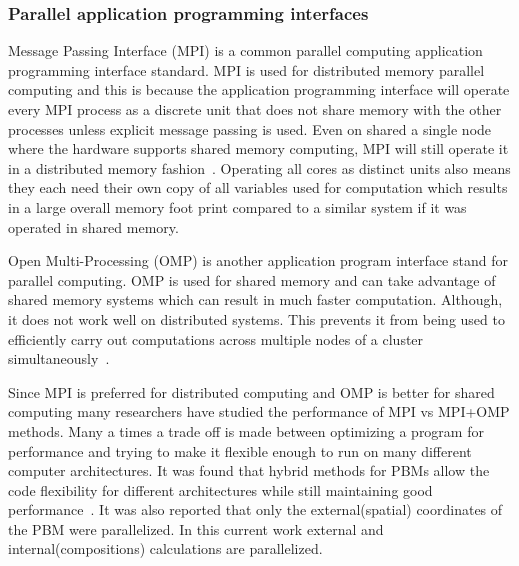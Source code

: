 \documentclass[preprint,11pt,authoryear]{elsarticle}
\begin{document}
\subsubsection{Parallel application programming interfaces}
Message Passing Interface (MPI) is a common parallel computing application 
programming interface standard. MPI is used for distributed memory parallel computing and this is 
because the application programming interface will operate 
every MPI process as a discrete unit that does not share memory with the other processes unless explicit 
message passing is used. Even on shared a single node where the hardware supports shared 
memory computing, MPI will still operate it in a distributed memory fashion~\citep{Jin2011}. Operating all 
cores as distinct units also means they each need their own copy of all variables used for computation 
which results in a large overall memory foot print compared to a similar system if it was operated in 
shared memory. 

Open Multi-Processing (OMP) is another application program interface stand for parallel 
computing. OMP is used for shared memory and can take advantage of shared memory systems which 
can result in much faster computation. Although, it does not work well on distributed systems. This 
prevents it from being used to efficiently carry out computations across multiple nodes of a cluster 
simultaneously~\citep{Jin2011}. 

Since MPI is preferred for distributed computing and OMP is better for shared computing many 
researchers have studied the performance of MPI vs MPI+OMP methods. Many a times a trade off is made 
between optimizing a program for performance and trying to make it flexible enough to run on many 
different computer architectures. It was found that hybrid methods for PBMs allow the code 
flexibility for different architectures while still maintaining good performance~\citep{Bettencourt2017}.  
It was also reported that only the external(spatial) coordinates of the PBM were parallelized. 
In this current work external and internal(compositions) calculations are parallelized. 
\end{document}
